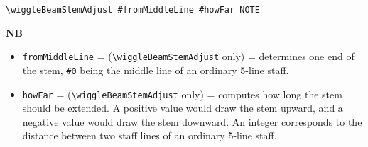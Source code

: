 \hrulefill
\begin{verbatim}
\wiggleBeamStemAdjust #fromMiddleLine #howFar NOTE
\end{verbatim}
\textbf{NB} 
\begin{itemize}
\item \verb|fromMiddleLine| = (\verb|\wiggleBeamStemAdjust| only) = determines one end of the stem, \verb|#0| being the middle line of an ordinary 5-line staff. 
\item \verb|howFar| = (\verb|\wiggleBeamStemAdjust| only) = computes how long the stem should be extended. A positive value would draw the stem upward, and a negative value would draw the stem downward. An integer corresponds to the distance between two staff lines of an ordinary 5-line staff.
\end{itemize}

